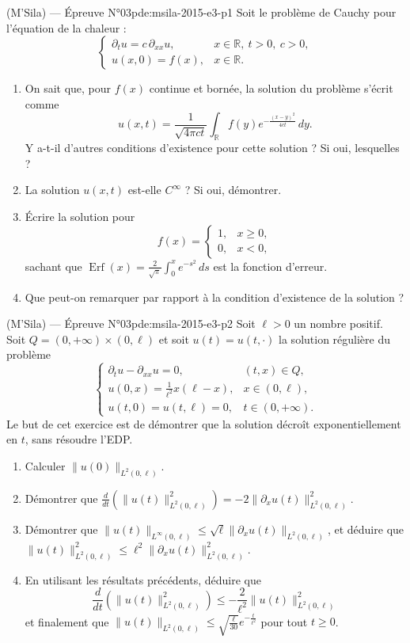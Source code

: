 \newpage
\begin{problem}{(M'Sila) — Épreuve N°03}{pde:msila-2015-e3-p1}
Soit le problème de Cauchy pour l'équation de la chaleur :
$$\begin{cases}\partial_tu=c\,\partial_{xx}u, & x\in\mathbb{R},\ t>0,\ c>0,\\ u(x,0)=f(x), & x\in\mathbb{R}.\end{cases}$$
\begin{enumerate}\item On sait que, pour $f(x)$ continue et bornée, la solution du problème s'écrit comme
$$u(x,t)=\frac{1}{\sqrt{4\pi ct}}\int_{\mathbb{R}}f(y)e^{-\frac{(x-y)^2}{4ct}}\,dy.$$
Y a-t-il d'autres conditions d'existence pour cette solution ? Si oui, lesquelles ?\item La solution $u(x,t)$ est-elle $C^\infty$ ? Si oui, démontrer.\item Écrire la solution pour
$$f(x)=\begin{cases}1, & x\geq0,\\ 0, & x<0,\end{cases}$$
sachant que $\operatorname{Erf}(x)=\frac{2}{\sqrt{\pi}}\int_0^xe^{-s^2}\,ds$ est la fonction d'erreur.\item Que peut-on remarquer par rapport à la condition d'existence de la solution ?\end{enumerate}
\end{problem}
\newpage
\begin{problem}{(M'Sila) — Épreuve N°03}{pde:msila-2015-e3-p2}
Soit $\ell>0$ un nombre positif. Soit $Q=(0,+\infty)\times(0,\ell)$ et soit $u(t)=u(t,\cdot)$ la solution régulière du problème
$$\begin{cases}\partial_tu-\partial_{xx}u=0, & (t,x)\in Q,\\ u(0,x)=\frac{1}{\ell^2}x(\ell-x), & x\in(0,\ell),\\ u(t,0)=u(t,\ell)=0, & t\in(0,+\infty).\end{cases}$$
Le but de cet exercice est de démontrer que la solution décroît exponentiellement en $t$, sans résoudre l'EDP.
\begin{enumerate}\item Calculer $\lVert u(0)\rVert_{L^2(0,\ell)}$.\item Démontrer que $\frac{d}{dt}\left(\lVert u(t)\rVert_{L^2(0,\ell)}^2\right)=-2\lVert\partial_xu(t)\rVert_{L^2(0,\ell)}^2$.\item Démontrer que $\lVert u(t)\rVert_{L^\infty(0,\ell)}\leq\sqrt{\ell}\lVert\partial_xu(t)\rVert_{L^2(0,\ell)}$, et déduire que $\lVert u(t)\rVert_{L^2(0,\ell)}^2\leq\ell^2\lVert\partial_xu(t)\rVert_{L^2(0,\ell)}^2$.\item En utilisant les résultats précédents, déduire que
$$\frac{d}{dt}\left(\lVert u(t)\rVert_{L^2(0,\ell)}^2\right)\leq-\frac{2}{\ell^2}\lVert u(t)\rVert_{L^2(0,\ell)}^2$$
et finalement que $\lVert u(t)\rVert_{L^2(0,\ell)}\leq\sqrt{\frac{\ell}{30}}e^{-\frac{t}{\ell^2}}$ pour tout $t\geq0$.\end{enumerate}
\end{problem}

